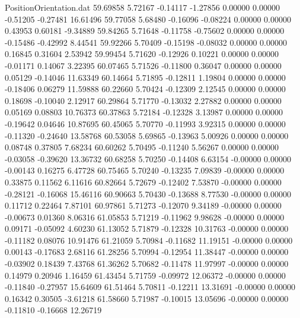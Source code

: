 \begin{filecontents}{PositionOrientation.dat}
  59.69858    5.72167   -0.14117    -1.27856    0.00000    0.00000   -0.51205   -0.27481   16.61496
  59.77058    5.68480   -0.16096    -0.08224    0.00000    0.00000    0.43953    0.60181   -9.34889
  59.84265    5.71648   -0.11758    -0.75602    0.00000    0.00000   -0.15486   -0.42992    8.44541
  59.92266    5.70409   -0.15198    -0.08032    0.00000    0.00000    0.16845    0.31604    2.53942
  59.99454    5.71620   -0.12926     0.10221    0.00000    0.00000   -0.01171    0.14067    3.22395
  60.07465    5.71526   -0.11800     0.36047    0.00000    0.00000    0.05129   -0.14046   11.63349
  60.14664    5.71895   -0.12811     1.19804    0.00000    0.00000   -0.18406    0.06279   11.59888
  60.22660    5.70424   -0.12309     2.12545    0.00000    0.00000    0.18698   -0.10040    2.12917
  60.29864    5.71770   -0.13032     2.27882    0.00000    0.00000    0.05169    0.08803   10.76373
  60.37863    5.72184   -0.12328     3.13987    0.00000    0.00000   -0.19642    0.04646   10.87695
  60.45065    5.70770   -0.11993     3.92315    0.00000    0.00000   -0.11320   -0.24640   13.58768
  60.53058    5.69865   -0.13963     5.00926    0.00000    0.00000    0.08748    0.37805    7.68234
  60.60262    5.70495   -0.11240     5.56267    0.00000    0.00000   -0.03058   -0.39620   13.36732
  60.68258    5.70250   -0.14408     6.63154   -0.00000    0.00000   -0.00143    0.16275    6.47728
  60.75465    5.70240   -0.13235     7.09839   -0.00000    0.00000    0.33875    0.11562    6.11616
  60.82664    5.72679   -0.12402     7.53870   -0.00000    0.00000   -0.28121   -0.16068   15.46116
  60.90663    5.70430   -0.13688     8.77530   -0.00000    0.00000    0.11712    0.22464    7.87101
  60.97861    5.71273   -0.12070     9.34189   -0.00000    0.00000   -0.00673    0.01360    8.06316
  61.05853    5.71219   -0.11962     9.98628   -0.00000    0.00000    0.09171   -0.05092    4.60230
  61.13052    5.71879   -0.12328    10.31763   -0.00000    0.00000   -0.11182    0.08076   10.91476
  61.21059    5.70984   -0.11682    11.19151   -0.00000    0.00000    0.00143   -0.17683    2.68116
  61.28256    5.70994   -0.12954    11.38447   -0.00000    0.00000   -0.03902    0.18439    7.43768
  61.36262    5.70682   -0.11478    11.97997   -0.00000    0.00000    0.14979    0.20946    1.16459
  61.43454    5.71759   -0.09972    12.06372   -0.00000    0.00000   -0.11840   -0.27957   15.64609
  61.51464    5.70811   -0.12211    13.31691   -0.00000    0.00000    0.16342    0.30505   -3.61218
  61.58660    5.71987   -0.10015    13.05696   -0.00000    0.00000   -0.11810   -0.16668   12.26719

\end{filecontents}
